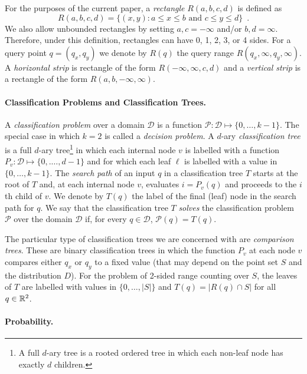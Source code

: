 \documentclass{patmorin}
\begin{document}
For the purposes of the current paper, a \emph{rectangle}
$R(a,b,c,d)$ is defined as
\[
    R(a,b,c,d) = \{ (x,y) : \mbox{$a\le  x \le b$ and $c \le y \le d$}\}
	\enspace .
\]
We also allow unbounded rectangles by setting $a,c=-\infty$ and/or
$b,d=\infty$.  Therefore, under this definition, rectangles can have
0, 1, 2, 3, or 4 sides.  For a query point $q=(q_x,q_y)$ we denote 
by $R(q)$ the query range $R(q_x,\infty,q_y,\infty)$.  A
\emph{horizontal strip} is rectangle of the form
$R(-\infty,\infty,c,d)$ and a \emph{vertical strip} is a rectangle of
the form $R(a,b,-\infty,\infty)$.

\paragraph{Classification Problems and Classification Trees.}

A \emph{classification problem} over a domain $\mathcal{D}$ is a
function $\mathcal{P}:\mathcal{D}\mapsto \{0,\ldots,k-1\}$.  The
special case in which $k=2$ is called a \emph{decision problem}.  A
$d$-ary \emph{classification tree} is a full $d$-ary tree\footnote{A
full $d$-ary tree is a rooted ordered tree in which each non-leaf node
has exactly $d$ children.} in which each internal node $v$ is labelled
with a function $P_v:\mathcal{D}\mapsto\{0,.\ldots,d-1\}$ and for
which each leaf $\ell$ is labelled with a value
in $\{0,\ldots,k-1\}$. The \emph{search path} of an input $q$
in a classification tree $T$ starts at the root of $T$ and, at each
internal node $v$, evaluates $i=P_v(q)$ and proceeds to the $i$th
child of $v$.  We denote by $T(q)$ the label of the final (leaf) node
in the search path for $q$.  We say that the classification tree $T$
\emph{solves} the classification problem $\mathcal{P}$ over the domain
$\mathcal{D}$ if, for every $q\in \mathcal{D}$, $\mathcal{P}(q)=T(q)$.

The particular type of classification trees we are concerned with are
\emph{comparison trees}.  These are binary classification trees in
which the function $P_v$ at each node $v$ compares either $q_x$ or
$q_y$ to a fixed value (that may depend on the point set $S$ and the
distribution $D$).  For the problem of 2-sided range counting over
$S$, the leaves of $T$ are labelled with values in $\{0,\ldots,|S|\}$
and $T(q)=|R(q)\cap S|$ for all $q\in\mathbb{R}^2$.


\paragraph{Probability.}
\end{document}
